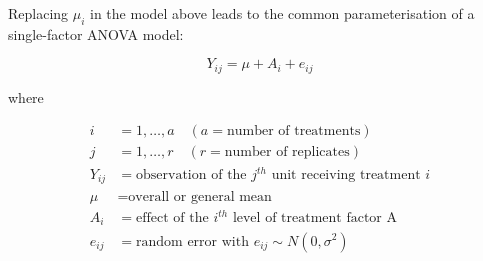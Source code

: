 \documentclass[
  letterpaper,
  DIV=11,
  numbers=noendperiod,
  oneside]{scrreprt}
\begin{document}
Replacing \(\mu_i\) in the model above leads to the common
parameterisation of a single-factor ANOVA model:

\[
Y_{ij} = \mu + A_{i} + e_{ij}
\]

where

\begin{equation}
\begin{aligned}
i & = 1, \dots, a \quad (a = \text{number of treatments}) \\
j & = 1, \dots, r \quad (r = \text{number of replicates}) \\
Y_{ij} & = \text{observation of the } j^{th} \text{ unit receiving treatment } i \\
\mu & = \text{overall or general mean} \\
A_i & = \text{effect of the } i^{th} \text{ level of treatment factor A} \\
e_{ij} & = \text{random error with } e_{ij} \sim N(0, \sigma^2)
\end{aligned}
\end{equation}
\end{document}
